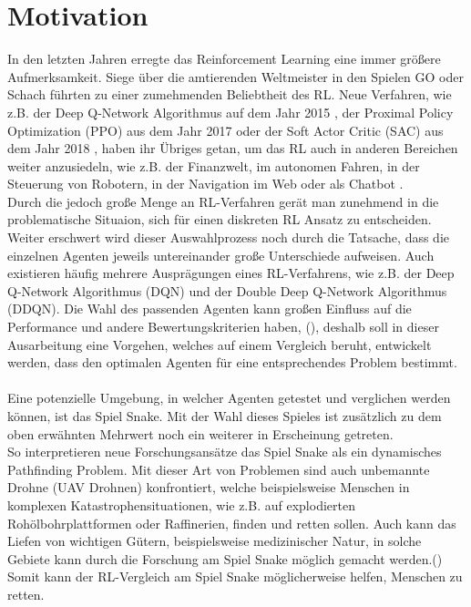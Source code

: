\section{Motivation} \label{sec:Motivation}
In den letzten Jahren erregte das Reinforcement Learning eine immer größere Aufmerksamkeit. Siege über die amtierenden Weltmeister in den Spielen GO oder Schach führten zu einer zumehmenden Beliebtheit des RL. Neue Verfahren, wie z.B. der Deep Q-Network Algorithmus auf dem Jahr 2015 \cite{DQN}, der Proximal Policy Optimization (PPO) aus dem Jahr 2017 \cite{PPO} oder der Soft Actor Critic (SAC) aus dem Jahr 2018 \cite{SAC}, haben ihr Übriges getan, um das RL auch in anderen Bereichen weiter anzusiedeln, wie z.B. der Finanzwelt, im autonomen Fahren, in der Steuerung von Robotern, in der Navigation im Web oder als Chatbot \cite{DRL_Lapan}.\\
Durch die jedoch große Menge an RL-Verfahren gerät man zunehmend in die problematische Situaion, sich für einen diskreten RL Ansatz zu entscheiden. Weiter erschwert wird dieser Auswahlprozess noch durch die Tatsache, dass die einzelnen Agenten jeweils untereinander große Unterschiede aufweisen. Auch existieren häufig mehrere Ausprägungen eines RL-Verfahrens, wie z.B. der Deep Q-Network Algorithmus (DQN) und der Double Deep Q-Network Algorithmus (DDQN). Die Wahl des passenden Agenten kann großen Einfluss auf die Performance und andere Bewertungskriterien haben, (\cite{Exploration_of_Reinforcement_Learning_to_SNAKE}), deshalb soll in dieser Ausarbeitung eine Vorgehen, welches auf einem Vergleich beruht, entwickelt werden, dass den optimalen Agenten für eine entsprechendes Problem bestimmt.\\
\\Eine potenzielle Umgebung, in welcher Agenten getestet und verglichen werden können, ist das Spiel Snake.
Mit der Wahl dieses Spieles ist zusätzlich zu dem oben erwähnten Mehrwert noch ein weiterer in Erscheinung getreten.\\ 
So interpretieren neue Forschungsansätze das Spiel Snake als ein dynamisches Pathfinding Problem. Mit dieser Art von Problemen sind auch unbemannte Drohne (UAV Drohnen) konfrontiert, welche beispielsweise Menschen in komplexen Katastrophensituationen, wie z.B. auf explodierten Rohölbohrplattformen oder Raffinerien, finden und retten sollen. Auch kann das Liefen von wichtigen Gütern, beispielsweise medizinischer Natur, in solche Gebiete kann durch die Forschung am Spiel Snake möglich gemacht werden.(\cite{UAV})\\
Somit kann der RL-Vergleich am Spiel Snake möglicherweise helfen, Menschen zu retten.

